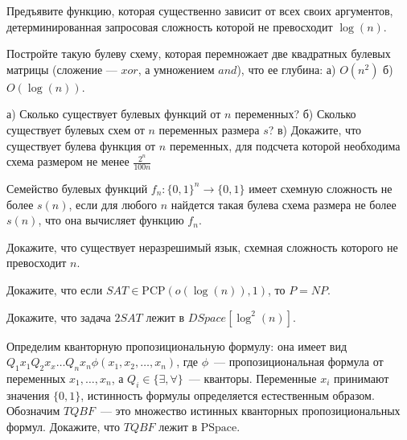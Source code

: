 \setcounter{curtask}{47}


\begin{task}
    Предъявите функцию, которая существенно зависит от всех своих аргументов,
    детерминированная запросовая сложность которой не превосходит $\log(n)$.
\end{task}

\begin{task}
    Постройте такую булеву схему, которая перемножает две квадратных булевых матрицы
    (сложение --- $xor$, а умножением $and$), что ее глубина:
    а) $O(n^2)$
    б) $O(\log(n))$.
\end{task}

\begin{task}
    а) Сколько существует булевых функций от $n$ переменных?
    б) Сколько существует булевых схем от $n$ переменных размера $s$?
    в) Докажите, что существует булева функция от $n$ переменных, для подсчета
    которой необходима схема размером не менее $\frac{2^n}{100n}$
\end{task}

\begin{task}
    Семейство булевых функций $f_n: \{0, 1\}^n \rightarrow \{0, 1\}$ имеет схемную
    сложность не более $s(n)$, если для любого $n$ найдется такая булева схема
    размера не более $s(n)$, что она вычисляет функцию $f_n$.

    Докажите, что существует неразрешимый язык, схемная сложность которого не
    превосходит $n$.
\end{task}

\breakline

\begin{ptask}{39}
    Докажите, что если $SAT \in \mathrm{PCP}(o(\log(n)), 1)$, то $P = NP$.
\end{ptask}

\begin{ptask}{41}
	Докажите, что задача $2SAT$ лежит в $DSpace[\log^2(n)]$.    
\end{ptask}

\begin{ptask}{42}
	Определим кванторную пропозициональную формулу: она имеет вид \\
    $Q_1 x_1 Q_2 x_x \dots Q_n x_n \phi(x_1, x_2, \dots, x_n)$, где $\phi$~---
    пропозициональная формула от переменных $x_1, \dots, x_n$, а $Q_i \in \{\exists,
    \forall\}$~--- кванторы. Переменные $x_i$ принимают значения $\{0, 1\}$,
    истинность формулы определяется естественным образом. Обозначим $TQBF$~--- это
    множество истинных кванторных пропозициональных формул. Докажите, что $TQBF$
    лежит в $\mathrm{PSpace}$.
\end{ptask}

